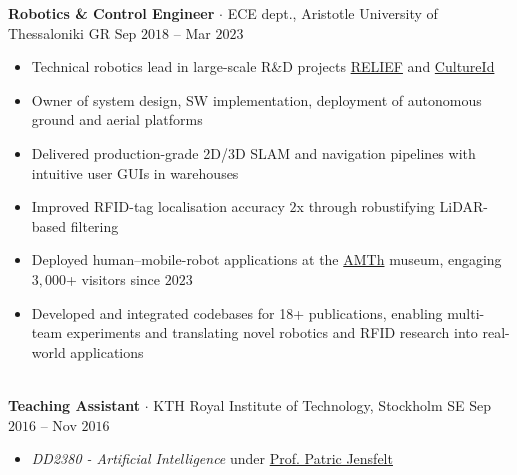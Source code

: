 \documentclass[a4paper,10pt,twoside]{article}
\newcommand{\verticalspacebetweensections}{\vspace{0em}}
\newcommand{\verticalspaceafteritem}{\vspace{-0.8em}}
\begin{document}
  \noindent\textbf{Robotics \& Control Engineer} $\cdot$ ECE dept., Aristotle University of Thessaloniki GR \hfill {\small \textcolor{datecolour}{Sep $2018$ -- Mar $2023$}} \\
  \begin{minipage}[t]{\textwidth}
    \begin{itemize}
      \item Technical robotics lead in large-scale R\&D projects \href{https://relief.web.auth.gr/language/en/home/}{RELIEF} and \href{https://cultureid.web.auth.gr/?page\_id=200&lang=en}{CultureId} \verticalspaceafteritem
      \item Owner of system design, SW implementation, deployment of autonomous ground and aerial platforms \verticalspaceafteritem
      \item Delivered production-grade 2D/3D SLAM and navigation pipelines with intuitive user GUIs in warehouses\verticalspaceafteritem
      \item Improved RFID-tag localisation accuracy $2$x through robustifying LiDAR-based filtering \verticalspaceafteritem
      \item Deployed human--mobile-robot applications at the \href{https://www.amth.gr/en}{AMTh} museum, engaging $3,000$+ visitors since $2023$ \verticalspaceafteritem
      \item Developed and integrated codebases for 18+ publications, enabling multi-team experiments and translating novel robotics and RFID research into real-world applications
    \end{itemize}
  \end{minipage} \\[0.2em]

  \noindent\textbf{Teaching Assistant} $\cdot$ KTH Royal Institute of Technology, Stockholm SE \hfill {\small \textcolor{datecolour}{Sep $2016$ -- Nov $2016$}} \\
  \begin{minipage}[t]{\textwidth}
    \begin{itemize}
      \item \textit{DD2380 - Artificial Intelligence} under \href{https://www.kth.se/profile/patric}{Prof. Patric Jensfelt}
    \end{itemize}
  \end{minipage} \\[-1em]
\verticalspacebetweensections

\end{document}
